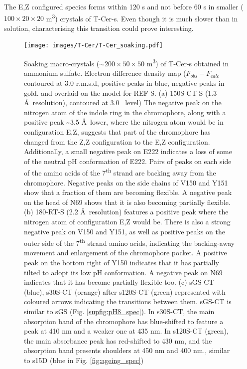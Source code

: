 The E,Z configured species forms within 120 s and not before 60 s in smaller (\(100 \times 20 \times 20 \) \textmu m\textsuperscript{3}) crystals of T-Cer-s. Even though it is much slower than in solution, characterising this transition could prove interesting. 
\begin{figure}[H] %
    \centering
        \noindent \texttt{[image: images/T-Cer/T-Cer\_soaking.pdf]}
    \hfill
    \caption{Soaking macro-crystals (\(\sim 200 \times 50 \times 50\) \textmu m\textsuperscript{3}) of T-Cer-s obtained in ammonium sulfate. Electron difference density map (\(F_{obs} - F_{calc}\) contoured at 3.0 r.m.s.d, positive peaks in blue, negative peaks in gold. and overlaid on the model for REF-S. (a) 150S-CT-S (1.3 \AA\ resolution), contoured at 3.0 \textsigma\ level) The negative peak on the nitrogen atom of the indole ring in the chromophore, along with a positive peak \textasciitilde 3.5 \AA\ lower, where the nitrogen atom would be in configuration E,Z,  suggests that part of the chromophore has changed from the Z,Z configuration to the E,Z configuration. Additionally, a small negative peak on E222 indicates a loss of some of the neutral pH conformation of E222. Pairs of peaks on each side of the amino acids of the 7\textsuperscript{th} strand are backing away from the chromophore. Negative peaks on the side chains of V150 and Y151 show that a fraction of them are becoming flexible. A negative peak on the head of N69 shows that it is also becoming partially flexible. 
    (b) 180-RT-S (2.2 \AA\ resolution) features a positive peak where the nitrogen atom of configuration E,Z would be. There is also a strong negative peak on V150 and Y151, as well as positive peaks on the outer side of the 7\textsuperscript{th} strand amino acids, indicating the backing-away movement and enlargement of the chromophore pocket. A positive peak on the bottom right of Y150 indicates that it has partially tilted to adopt its low pH conformation. A negative peak on N69 indicates that it has become partially flexible too. 
    (c) sGS-CT (blue), s30S-CT (orange) after s120S-CT (green) represented with coloured arrows indicating the transitions between them. sGS-CT is similar to sGS (Fig. \ref{supfig:pH8_spec}). In s30S-CT, the main absorption band of the chromophore has blue-shifted to feature a peak at 410 nm and a weaker one at 435 nm. In s120S-CT (green), the main absorbance peak has red-shifted to 430 nm, and the absorption band presents shoulders at 450 nm and 400 nm., similar to s15D (blue in Fig. \ref{fig:ageing_spec})}\label{fig:T-Cer-soak-struc}
\end{figure}

